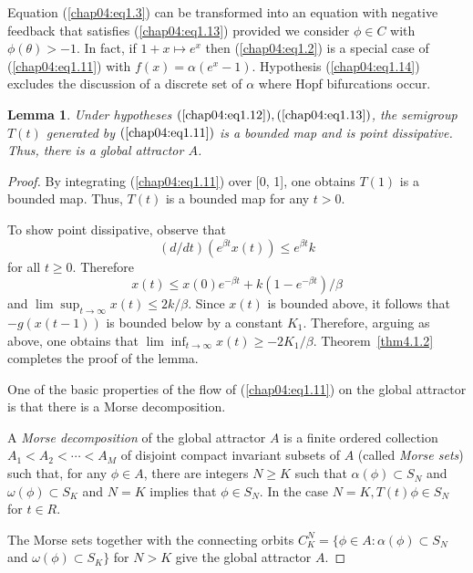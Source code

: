 \documentclass{surv-l}
\theoremstyle{plain}
\newtheorem{lemma}[theorem]{Lemma}
\theoremstyle{definition}
\numberwithin{equation}{section}
\numberwithin{figure}{chapter}
\begin{document}
Equation (\ref{chap04:eq1.3}) can be transformed into an equation with negative feedback that satisfies (\ref{chap04:eq1.13}) provided we consider $\phi\in C$ with $\phi(\theta)>-1$. In fact, if $1+x\mapsto e^{x}$ then (\ref{chap04:eq1.2}) is a special case of (\ref{chap04:eq1.11}) with $f(x)=\alpha(e^{x}-1)$. Hypothesis (\ref{chap04:eq1.14}) excludes the discussion of a discrete set of $\alpha$ where Hopf bifurcations occur.

\begin{lemma}\label{lem4.1.8}
Under hypotheses $(\ref{chap04:eq1.12}), (\ref{chap04:eq1.13})$, the semigroup $T(t)$ generated by $(\ref{chap04:eq1.11})$ is a bounded map and is point dissipative. Thus, there is a global attractor $A$.
\end{lemma}

\begin{proof}
By integrating (\ref{chap04:eq1.11}) over [0, 1], one obtains $T(1)$ is a bounded map. Thus, $T(t)$ is a bounded map for any $t>0$.

To show point dissipative, observe that
\begin{equation*}
(d/dt)(e^{\beta t}x(t))\leq e^{\beta t}k
\end{equation*}
for all $t\geq 0$. Therefore
\begin{equation*}
 x(t)\leq x(0)e^{-\beta t}+k(1-e^{-\beta t})/\beta
\end{equation*}
and $\lim\sup_{t\rightarrow\infty}x(t)\leq 2k/\beta$. Since $x(t)$ is bounded above, it follows that $-g(x(t-1))$ is bounded below by a constant $K_{1}$. Therefore, arguing as above, one obtains that $\lim\inf_{t\rightarrow\infty}x(t)\geq-2K_{1}/\beta$. Theorem~\ref{thm4.1.2} completes the proof of the lemma.

One of the basic properties of the flow of (\ref{chap04:eq1.11}) on the global attractor is that there is a Morse decomposition.

A \emph{Morse decomposition} of the global attractor $A$ is a finite ordered collection $A_{1}<A_{2}<\cdots <A_{M}$ of disjoint compact invariant subsets of $A$ (called \emph{Morse sets}) such that, for any $\phi \in A$, there are integers $N\geq K$ such that $\alpha(\phi)\subset S_{N}$ and $\omega(\phi)\subset S_{K}$ and $N=K$ implies that $\phi\in S_{N}$. In the case $N=K,T(t)\phi\in S_{N}$ for $t\in R$.

The Morse sets together with the connecting orbits $C_{K}^{N}=\{\phi\in A\!:\alpha(\phi)\subset S_{N}$ and $\omega(\phi)\subset S_{K}\}$ for $N>K$ give the global attractor $A$.


\end{proof}
\end{document}
